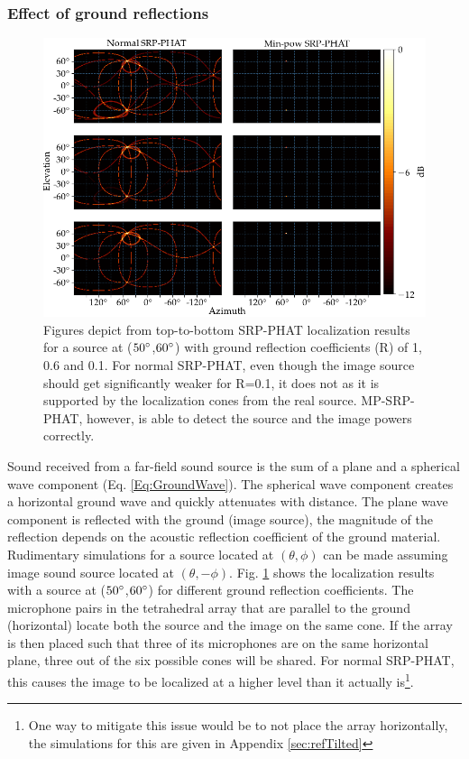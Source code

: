 \subsubsection{Effect of ground reflections}
\begin{figure}[!ht]
\centering
\includegraphics[width=\textwidth]{Figures/refSim.png}
\caption{Figures depict from top-to-bottom SRP-PHAT localization results for a source at ($50\degree$,$60\degree$) with ground reflection coefficients (R) of 1, 0.6 and 0.1. For normal SRP-PHAT, even though the image source should get significantly weaker for R=0.1, it does not as it is supported by the localization cones from the real source. MP-SRP-PHAT, however, is able to detect the source and the image powers correctly.}
\label{fig:4mic1srcRef}
\end{figure}
Sound received from a far-field sound source is the sum of a plane and a spherical wave component (Eq. \ref{Eq:GroundWave}). The spherical wave component creates a horizontal ground wave and quickly attenuates with distance. The plane wave component is reflected with the ground (image source), the magnitude of the reflection depends on the acoustic reflection coefficient of the ground material. Rudimentary simulations for a source located at $(\theta,\phi)$ can be made assuming image sound source located at $(\theta,-\phi)$. Fig. \ref{fig:4mic1srcRef} shows the localization results with a source at ($50\degree$,$60\degree$) for different ground reflection coefficients. The microphone pairs in the tetrahedral array that are parallel to the ground (horizontal) locate both the source and the image on the same cone. If the array is then placed such that three of its microphones are on the same horizontal plane, three out of the six possible cones will be shared. For normal SRP-PHAT, this causes the image to be localized at a higher level than it actually is\footnote{One way to mitigate this issue would be to not place the array horizontally, the simulations for this are given in Appendix \ref{sec:refTilted}}. 
